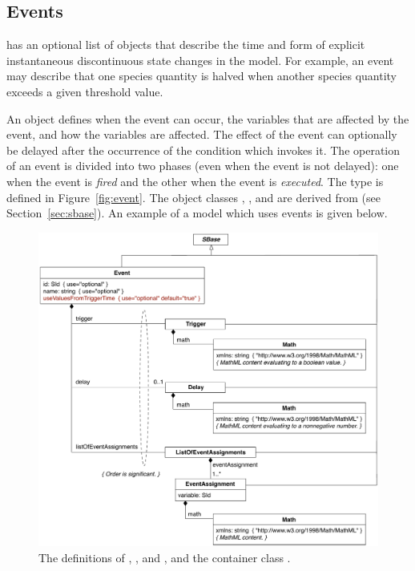 \subsection{Events}
\label{sec:events}

\Model has an optional list of \Event objects that describe the
time and form of explicit instantaneous discontinuous state
changes in the model.  For example, an event may describe that one
species quantity is halved when another species quantity exceeds a
given threshold value.

An \Event object defines when the event can occur, the
variables that are affected by the event, and how the variables
are affected.  The effect of the event can optionally be delayed
after the occurrence of the condition which invokes it.  The
operation of an event is divided into two phases (even
when the event is not delayed): one when the event is \emph{fired}
and the other when the event is \emph{executed}. The \Event type
is defined in Figure~\vref{fig:event}.  The
  object classes
  \Event, \Trigger, \Delay and \EventAssignment are derived from
  \SBase{} (see Section~\ref{sec:sbase}).  An example
of a model which uses events is given below.

\begin{figure}[htb]
  \centering
  \small
  \includegraphics[scale=0.8]{figs/event-uml}
  \caption{The definitions of \Event, \Trigger, \Delay
      and \EventAssignment, and the container class
      \ListOfEventAssignments.}
  \label{fig:event}
\end{figure}


